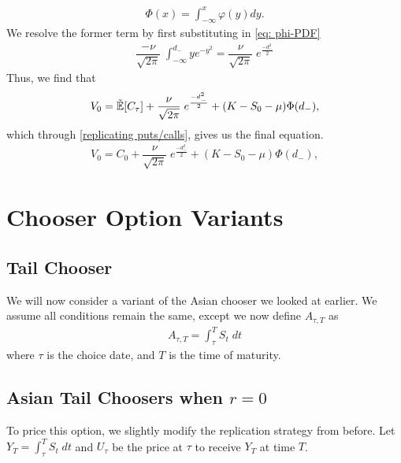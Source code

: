 \documentclass[reqno]{amsart}
\begin{document}
\begin{align} \label{eq: cdfnormal}
     \Phi(x) = \int_{-\infty}^x \varphi(y) dy.
\end{align}
We resolve the former term by first substituting in \eqref{eq: phi-PDF}
\begin{align}
     \dfrac{-\nu}{\sqrt{2\pi}} \;\int_{-\infty}^{d_{-}} ye^{-y^2} = \dfrac{\nu}{\sqrt{2\pi}} \;e^{\frac{-d_-^2}{2}}
\end{align}
Thus, we find that
\begin{align}
     V_0 = \tilde{\mathbb{E}}[C_\tau] + \dfrac{\nu}{\sqrt{2\pi}} \;e^{\frac{-d_-^2}{2}} +  (K- S_0 - \mu) \Phi(d_-),
\end{align}
which through \eqref{replicating puts/calls}, gives us the final equation.
\begin{align}
     V_0 = C_0 + \dfrac{\nu}{\sqrt{2\pi}} \;e^{\frac{-d_-^2}{2}} +  (K- S_0 - \mu) \Phi(d_-),
\end{align}

\section{Chooser Option Variants}

\subsection{Tail Chooser}
We will now consider a variant of the Asian chooser we looked at earlier. We assume all conditions remain the same, except we now define $A_{\tau, T}$ as
\begin{align}
     A_{\tau, T} = \int_\tau^T S_t \;dt
\end{align}
where $\tau$ is the choice date, and $T$ is the time of maturity.

\subsection{Asian Tail Choosers when $r = 0$}
To price this option, we slightly modify the replication strategy from before. Let $Y_T = \int_\tau^T S_t \;dt$ and $U_\tau$ be the price at $\tau$ to receive $Y_T$ at time $T$.
\end{document}
